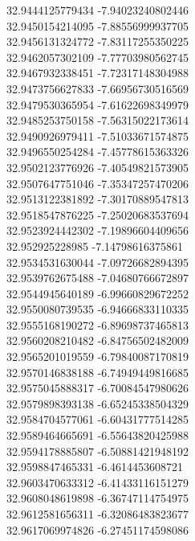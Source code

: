 {32.9444125779434	-7.94023240802446\\
32.9450154214095	-7.88556999937705\\
32.9456131324772	-7.83117255350225\\
32.9462057302109	-7.77703980562745\\
32.9467932338451	-7.72317148304988\\
32.9473756627833	-7.66956730516569\\
32.9479530365954	-7.61622698349979\\
32.9485253750158	-7.56315022173614\\
32.9490926979411	-7.51033671574875\\
32.9496550254284	-7.45778615363326\\
32.9502123776926	-7.40549821573905\\
32.9507647751046	-7.35347257470206\\
32.9513122381892	-7.30170889547813\\
32.9518547876225	-7.25020683537694\\
32.9523924442302	-7.19896604409656\\
32.952925228985	-7.14798616375861\\
32.9534531630044	-7.09726682894395\\
32.9539762675488	-7.04680766672897\\
32.9544945640189	-6.99660829672252\\
32.9550080739535	-6.94666833110335\\
32.9555168190272	-6.89698737465813\\
32.9560208210482	-6.84756502482009\\
32.9565201019559	-6.79840087170819\\
32.9570146838188	-6.74949449816685\\
32.9575045888317	-6.70084547980626\\
32.9579898393138	-6.65245338504329\\
32.9584704577061	-6.60431777514285\\
32.9589464665691	-6.55643820425988\\
32.9594178885807	-6.50881421948192\\
32.9598847465331	-6.4614453608721\\
32.9603470633312	-6.41433116151279\\
32.9608048619898	-6.36747114754975\\
32.9612581656311	-6.32086483823677\\
32.9617069974826	-6.27451174598086\\
}
